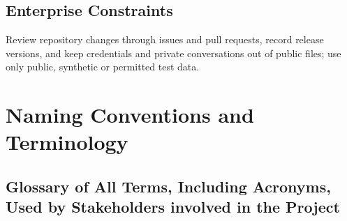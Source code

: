 \documentclass[12pt]{article}
\begin{document}
\subsection{Enterprise Constraints}
Review repository changes through issues and pull requests, record release
versions, and keep credentials and private conversations out of public files;
use only public, synthetic or permitted test data.


\section{Naming Conventions and Terminology}


\subsection{Glossary of All Terms, Including Acronyms, Used by Stakeholders
involved in the Project}
\end{document}
